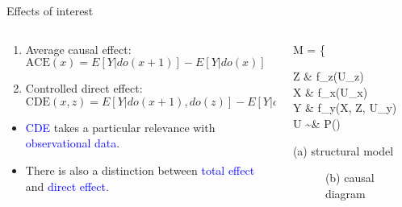 %
%
\begin{frame}
	{Effects of interest}
	\begin{columns}
		\begin{column}{0.5\textwidth}
			\begin{enumerate}
				\item Average causal effect: \\
				$\text{ACE}(x) = E[Y | do(x + 1)] - E[Y | do(x)]$
				\item Controlled direct effect: \\
				$\text{CDE}(x, z) = E[Y | do(x + 1), do(z)] - E[Y | do(x), do(z)]$
			\end{enumerate}
			\begin{itemize}
				\item \textcolor{blue}{CDE} takes a particular relevance with \textcolor{blue}{observational data}.
				\item There is also a distinction between \textcolor{blue}{total effect} and \textcolor{blue}{direct effect}.
			\end{itemize}
		\end{column}
		\begin{column}{0.5\textwidth}  
			\begin{equ}
				M = \left\{ \begin{aligned} 
					Z \leftarrow & \; f_{z}(U_{z}) \\
					X \leftarrow & \; f_{x}(U_{x}) \\
					Y \leftarrow & \; f_{y}(X, Z, U_{y}) \\
					U \sim & \; P()
				\end{aligned} \right
				\caption*{(a) structural model}
			\end{equ}
			\begin{figure}
				\caption*{(b) causal diagram}
			\end{figure}
		\end{column}
	\end{columns}
\end{frame}
%
%
